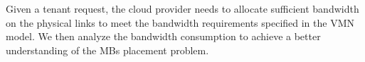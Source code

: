 \documentclass[review]{elsarticle}
\begin{document}

Given a tenant request, the cloud provider needs to allocate sufficient bandwidth on the physical links to meet the bandwidth requirements specified in the VMN model. We then analyze the bandwidth consumption to achieve a better understanding of the MBs placement problem. 
\end{document}
